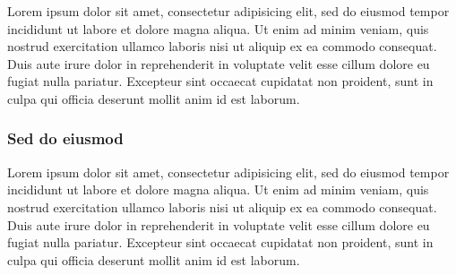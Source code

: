\documentclass{thesis_proposal}
\begin{document}
Lorem ipsum dolor sit amet, consectetur adipisicing elit, sed do
eiusmod tempor incididunt ut labore et dolore magna aliqua. Ut enim ad
minim veniam, quis nostrud exercitation ullamco laboris nisi ut
aliquip ex ea commodo consequat. Duis aute irure dolor in
reprehenderit in voluptate velit esse cillum dolore eu fugiat nulla
pariatur. Excepteur sint occaecat cupidatat non proident, sunt in
culpa qui officia deserunt mollit anim id est laborum.

\subsubsection{Sed do eiusmod}

Lorem ipsum dolor sit amet, consectetur adipisicing elit, sed do
eiusmod tempor incididunt ut labore et dolore magna aliqua. Ut enim ad
minim veniam, quis nostrud exercitation ullamco laboris nisi ut
aliquip ex ea commodo consequat. Duis aute irure dolor in
reprehenderit in voluptate velit esse cillum dolore eu fugiat nulla
pariatur. Excepteur sint occaecat cupidatat non proident, sunt in
culpa qui officia deserunt mollit anim id est laborum.



\backmatter                     %





\end{document}
